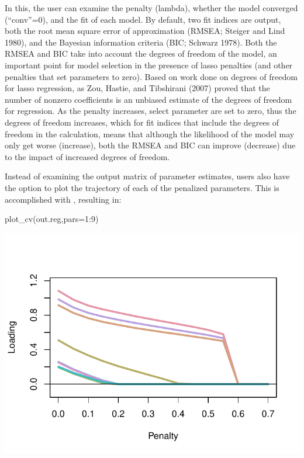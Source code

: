\documentclass[article]{jss}
\begin{document}
In this, the user can examine the penalty (lambda), whether the model
converged (``conv''=0), and the fit of each model. By default, two fit
indices are output, both the root mean square error of approximation
(RMSEA; Steiger and Lind 1980), and the Bayesian information criteria
(BIC; Schwarz 1978). Both the RMSEA and BIC take into account the
degrees of freedom of the model, an important point for model selection
in the presence of lasso penalties (and other penalties that set
parameters to zero). Based on work done on degrees of freedom for lasso
regression, as Zou, Hastie, and Tibshirani (2007) proved that the number
of nonzero coefficients is an unbiased estimate of the degrees of
freedom for regression. As the penalty increases, select parameter are
set to zero, thus the degrees of freedom increases, which for fit
indices that include the degrees of freedom in the calculation, means
that although the likelihood of the model may only get worse (increase),
both the RMSEA and BIC can improve (decrease) due to the impact of
increased degrees of freedom.

Instead of examining the  output matrix of parameter
estimates, users also have the option to plot the trajectory of each of
the penalized parameters. This is accomplished with
, resulting in:

\begin{CodeChunk}
\begin{CodeInput}
plot_cv(out.reg,pars=1:9)
\end{CodeInput}


\begin{center}\includegraphics{draft1_files/figure-latex/unnamed-chunk-6-1} \end{center}

\end{CodeChunk}
\end{document}

